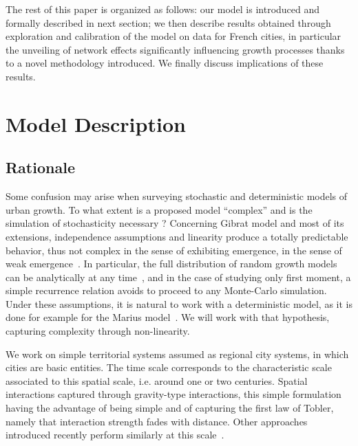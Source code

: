 \documentclass[Royal,sageh,times]{sagej}
\begin{document}
The rest of this paper is organized as follows: our model is introduced and formally described in  next section; we then describe results obtained through exploration and calibration of the model on data for French cities, in particular the unveiling of network effects significantly influencing growth processes thanks to a novel methodology introduced. We finally discuss implications of these results.





\section*{Model Description}




\subsection*{Rationale}


Some confusion may arise when surveying  stochastic and deterministic models of urban growth. To what extent is a proposed model ``complex'' and is the simulation of stochasticity necessary ? Concerning  Gibrat model and most of its extensions, independence assumptions and linearity produce a totally predictable behavior,  thus not complex in the sense of exhibiting emergence, in the sense of weak emergence~\citep{bedau2002downward}. In particular, the full distribution of random growth models can be analytically  at any time~\citep{gabaix1999zipf}, and in the case of studying only  first moment, a simple recurrence relation avoids to proceed to any Monte-Carlo simulation. Under these assumptions, it is natural to work with a deterministic model, as it is done for example for the Marius model~\citep{cottineau2014evolution}. We will work with that hypothesis, capturing complexity through non-linearity.

We work on simple territorial systems assumed as regional city systems, in which cities are basic entities. The time scale corresponds to the characteristic scale associated to this spatial scale, i.e. around one or two centuries. Spatial interactions  captured through gravity-type interactions, this simple formulation having the advantage of being simple and of capturing the first law of Tobler, namely that interaction strength fades with distance. Other approaches introduced recently perform similarly at this scale~\citep{masucci2013gravity}.
\end{document}
